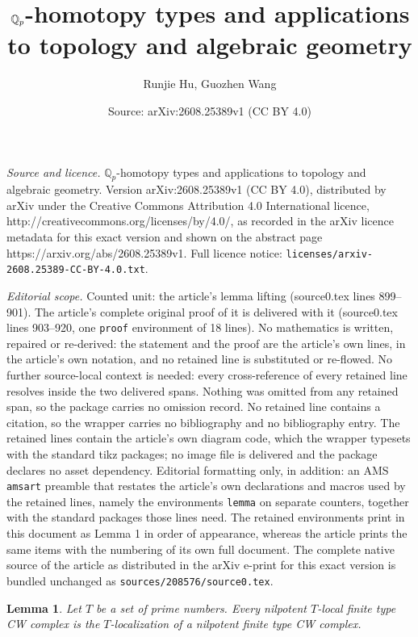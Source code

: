 \documentclass[10pt,a4paper]{amsart}
\title{$\QQ_p$-homotopy types and applications to topology and algebraic geometry}
\author{Runjie Hu, Guozhen Wang}
\date{Source: arXiv:2608.25389v1 (CC BY 4.0)}
\newcommand\QQ{\mathbb{Q}}
\newtheorem{lemma}{Lemma}
\begin{document}
\maketitle

\noindent\emph{Source and licence.} $\QQ_p$-homotopy types and applications to topology and algebraic geometry. Version arXiv:2608.25389v1 (CC BY 4.0), distributed by arXiv under the Creative Commons Attribution 4.0 International licence, http://creativecommons.org/licenses/by/4.0/, as recorded in the arXiv licence metadata for this exact version and shown on the abstract page https://arxiv.org/abs/2608.25389v1. Full licence notice: \texttt{licenses/arxiv-2608.25389-CC-BY-4.0.txt}.\par\smallskip

\noindent\textit{Editorial scope.} Counted unit: the article's lemma lifting (source0.tex lines 899--901). The article's complete original proof of it is delivered with it (source0.tex lines 903--920, one \texttt{proof} environment of 18 lines). No mathematics is written, repaired or re-derived: the statement and the proof are the article's own lines, in the article's own notation, and no retained line is substituted or re-flowed.  No further source-local context is needed: every cross-reference of every retained line resolves inside the two delivered spans.  Nothing was omitted from any retained span, so the package carries no omission record.  No retained line contains a citation, so the wrapper carries no bibliography and no bibliography entry.  The retained lines contain the article's own diagram code, which the wrapper typesets with the standard tikz packages; no image file is delivered and the package declares no asset dependency.  Editorial formatting only, in addition: an AMS \texttt{amsart} preamble that restates the article's own declarations and macros used by the retained lines, namely the environments \texttt{lemma} on separate counters, together with the standard packages those lines need.  The retained environments print in this document as Lemma 1 in order of appearance, whereas the article prints the same items with the numbering of its own full document.  The complete native source of the article as distributed in the arXiv e-print for this exact version is bundled unchanged as \texttt{sources/208576/source0.tex}.
\begin{lemma}\label{Lem: local spaces have an integral lifting}
Let $T$ be a set of prime numbers. Every nilpotent $T$-local finite type CW complex is the $T$-localization of a nilpotent finite type CW complex.  
\end{lemma} 
\end{document}

